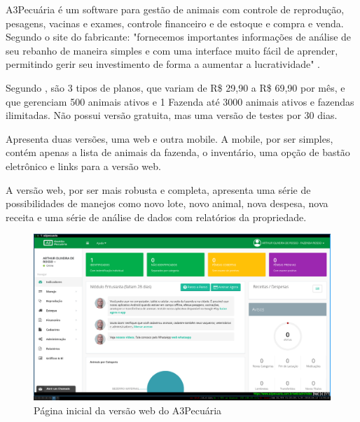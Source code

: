 \documentclass[12pt]{article}
\begin{document}
\begin{titlepage}
A3Pecuária é um software para gestão de animais com controle de reprodução, pesagens, vacinas e exames, controle financeiro e de estoque e compra e venda. Segundo o site do fabricante: "fornecemos importantes informações de análise de seu rebanho de maneira simples e com uma interface muito fácil de aprender, permitindo gerir seu investimento de forma a aumentar a lucratividade" \cite{a3pecuaria16}.

Segundo , são 3 tipos de planos, que variam de R\$ 29,90 a R\$ 69,90 por mês, e que gerenciam 500 animais ativos e 1 Fazenda até 3000 animais ativos e fazendas ilimitadas. Não possui versão gratuita, mas uma versão de testes por 30 dias.

Apresenta duas versões, uma web e outra mobile. A mobile, por ser simples, contém apenas a lista de animais da fazenda, o inventário, uma opção de bastão eletrônico e links para a versão web.

A versão web, por ser mais robusta e completa, apresenta uma série de possibilidades de manejos como novo lote, novo animal, nova despesa, nova receita e uma série de análise de dados com relatórios da propriedade.


\begin{figure}[!h]
\begin{center}
\caption{Página inicial da versão web do A3Pecuária}
\includegraphics[width=6in]{img/a3pecuaria.png}

\end{center}
\end{figure}


\end{titlepage}
\end{document}
